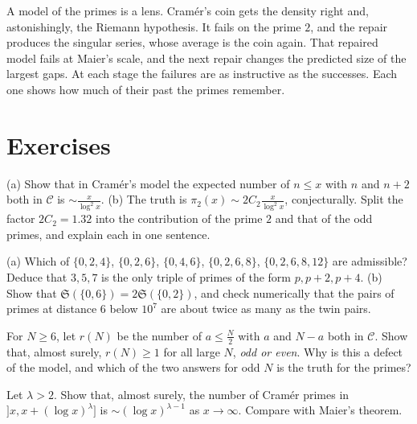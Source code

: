 \begin{beauty}
A model of the primes is a lens. Cramér's coin gets the density right and, astonishingly, the Riemann hypothesis. It fails on the prime $2$, and the repair produces the singular series, whose average is the
coin again. That repaired model fails at Maier's scale, and the next repair changes the predicted size of the largest gaps. At each stage the failures are as instructive as the successes. Each one shows
how much of their past the primes remember.
\end{beauty}

\section{Exercises}

\begin{exercise}[$\star$]\label{ex:modeltwins}
(a) Show that in Cramér's model the expected number of $n\le x$ with $n$ and $n+2$ both in $\mathcal C$ is $\sim\frac x{\log^2x}$.
(b) The truth is $\pi_2(x)\sim2C_2\frac x{\log^2x}$, conjecturally. Split the factor $2C_2=1.32$ into the contribution of the prime $2$ and that of the odd primes, and explain each in one sentence.
\end{exercise}

\begin{exercise}[$\star$]\label{ex:admissible}
(a) Which of $\{0,2,4\}$, $\{0,2,6\}$, $\{0,4,6\}$, $\{0,2,6,8\}$, $\{0,2,6,8,12\}$ are admissible? Deduce that $3,5,7$ is the only triple of primes of the form $p,p+2,p+4$.
(b) Show that $\mathfrak S(\{0,6\})=2\mathfrak S(\{0,2\})$, and check numerically that the pairs of primes at distance $6$ below $10^7$ are about twice as many as the twin pairs.
\end{exercise}

\begin{exercise}[$\star\star$]\label{ex:modelgoldbach}
For $N\ge6$, let $r(N)$ be the number of $a\le\frac N2$ with $a$ and $N-a$ both in $\mathcal C$. Show that, almost surely, $r(N)\ge1$ for all large $N$, \emph{odd or even}. Why is this a defect of the model, and which
of the two answers for odd $N$ is the truth for the primes?
\end{exercise}

\begin{exercise}[$\star\star$]\label{ex:shortmodel}
Let $\lambda>2$. Show that, almost surely, the number of Cramér primes in $]x,x+(\log x)^\lambda]$ is $\sim(\log x)^{\lambda-1}$ as $x\to\infty$. Compare with Maier's theorem.
\end{exercise}

